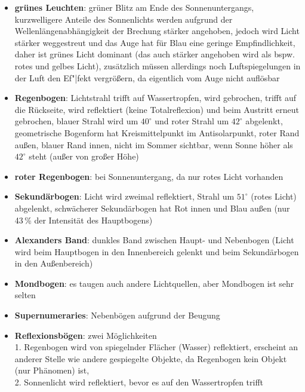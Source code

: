 \linie
\begin{itemize}
    \item
    \textbf{grünes Leuchten}:
    grüner Blitz am Ende des Sonnenuntergangs,
    kurzwelligere Anteile des Sonnenlichts werden aufgrund der
    Wellenlängenabhängigkeit der Brechung stärker angehoben, jedoch
    wird Licht stärker weggestreut und das Auge hat für Blau eine geringe
    Empfindlichkeit, daher ist grünes Licht dominant
    (das auch stärker angehoben wird als bspw. rotes und gelbes Licht),
    zusätzlich müssen allerdings noch Luftspiegelungen in der Luft den
    Ef"|fekt vergrößern, da eigentlich vom Auge nicht auflösbar
\end{itemize}
\linie
\pagebreak
\begin{itemize}
    \item
    \textbf{Regenbogen}:
    Lichtstrahl trifft auf Wassertropfen,
    wird gebrochen, trifft auf die Rückseite,
    wird reflektiert (keine Totalreflexion) und beim Austritt
    erneut gebrochen, blauer Strahl wird um $40^\circ$ und roter Strahl
    um $42^\circ$ abgelenkt,
    geometrische Bogenform hat Kreismittelpunkt im Antisolarpunkt,
    roter Rand außen, blauer Rand innen,
    nicht im Sommer sichtbar, wenn Sonne höher als $42^\circ$ steht
    (außer von großer Höhe)
    
    \item
    \textbf{roter Regenbogen}:
    bei Sonnenuntergang, da nur rotes Licht vorhanden
    
    \item
    \textbf{Sekundärbogen}:
    Licht wird zweimal reflektiert,
    Strahl um $51^\circ$ (rotes Licht) abgelenkt, schwächerer Sekundärbogen hat
    Rot innen und Blau außen (nur 43\,\% der Intensität des Hauptbogens)
    
    \item
    \textbf{Alexanders Band}:
    dunkles Band zwischen Haupt- und Nebenbogen
    (Licht wird beim Hauptbogen in den Innenbereich gelenkt und beim
    Sekundärbogen in den Außenbereich)
    
    \item
    \textbf{Mondbogen}:
    es taugen auch andere Lichtquellen,
    aber Mondbogen ist sehr selten
    
    \item
    \textbf{Supernumeraries}:
    Nebenbögen aufgrund der Beugung
    
    \item
    \textbf{Reflexionsbögen}: zwei Möglichkeiten \\
    1. Regenbogen wird von spiegelnder Flächer (Wasser) reflektiert,
    erscheint an anderer Stelle wie andere gespiegelte Objekte, da
    Regenbogen kein Objekt (nur Phänomen) ist, \\
    2. Sonnenlicht wird reflektiert, bevor es auf den Wassertropfen trifft
    

\end{itemize}
